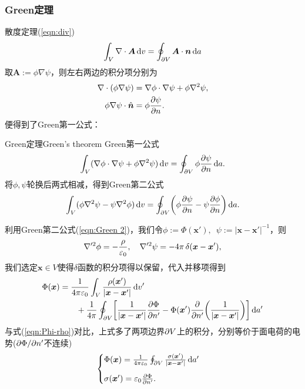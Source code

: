 \subsubsection{Green定理}
散度定理(\ref{eqn:div})
\[
    \int_V\nabla\cdot\bm A\mathop{}\!\mathrm{d} v=\oint_{\partial V}\bm A\cdot\bm n\mathop{}\!\mathrm{d} a
\]
取$\bm A:=\phi\nabla\psi$，则左右两边的积分项分别为
\begin{align*}
    \nabla\cdot(\phi\nabla\psi)&=\nabla\phi\cdot\nabla\psi+\phi\nabla^2\psi,\\
    \phi\nabla\psi\cdot\mathop{}\!\hat{\bm n}&=\phi\frac{\partial^{\;\!\!}\psi}{\partial n^{\;\!\!}}.
\end{align*}
便得到了Green第一公式：
\begin{theorem}{Green定理}{Green's theorem}
    Green第一公式
    \begin{equation}
        \label{eqn:Green 1}
        \int_V(\nabla\phi\cdot\nabla\psi+\phi\nabla^2\psi)\mathop{}\!\mathrm{d} v=\oint_{\partial V}\phi\frac{\partial^{\;\!\!}\psi}{\partial n^{\;\!\!}}\mathop{}\!\mathrm{d} a.
    \end{equation}
    将$\phi,\psi$轮换后两式相减，得到Green第二公式
    \begin{equation}
        \label{eqn:Green 2}
        \int_V(\phi\lapla\psi-\psi\lapla\phi)\d v=\oint_{\p V}\biggkh{\phi\pv\psi n-\psi\pv\phi n}\d a.
    \end{equation}
\end{theorem}
利用Green第二公式(\ref{eqn:Green 2})，我们令$\phi:=\Phi(\bm x'),\enspace\psi:=|\bm x-\bm x'|^{-1}$，则
\[
    \nabla'^2\phi=-\frac{\rho}{\varepsilon_0},\quad\nabla'^2\psi=-4\pi\mathop{}\!\delta(\bm x-\bm x'),
\]
我们选定$\bm x\in V$使得$\delta$函数的积分项得以保留，代入并移项得到
\begin{equation}
    \label{eqn:Phi-rho with boundary}
    \begin{aligned}
        \Phi(\bm x)&=\frac1{4\pi\varepsilon_0}\int_V\frac{\rho(\bm x')}{|\bm x-\bm x'|}\d v'\\
        &\qquad+\frac1{4\pi}\oint_{\p V}\biggfkh{\frac1{|\bm x-\bm x'|}\pv\Phi{n'}-\Phi(\bm x')\pp{n'}\biggkh{\frac1{|\bm x-\bm x'|}}}\d a'
    \end{aligned}
\end{equation}
与式(\ref{eqn:Phi-rho})对比，上式多了两项边界$\partial V$上的积分，分别等价于面电荷的电势($\partial\Phi/\partial n'$不连续)
\[
    \begin{cases}
        \Phi(\bm x)=\frac1{4\pi\varepsilon_0}\oint_{\partial V}\frac{\sigma(\bm x')}{|\bm x-\bm x'|}\mathop{}\!\mathrm{d} a'\\[2ex]
        \sigma(\bm x')=\varepsilon_0\frac{\partial^{\;\!\!}\Phi}{\partial n'^{\;\!\!}}.
    \end{cases}
\]
